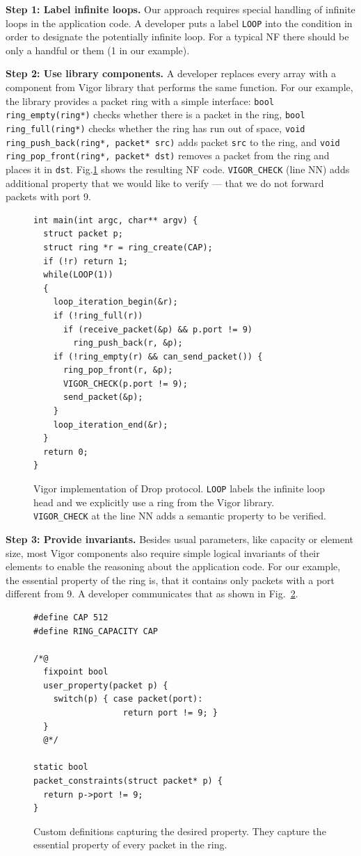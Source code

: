 \documentclass[letterpaper,twocolumn,10pt]{article}
\newcommand{\code}[1]{\lstinline{#1}}
\begin{document}
{\bf Step 1: Label infinite loops.} Our approach requires special handling of
infinite loops in the application code. A developer puts a label \code{LOOP}
into the condition in order to designate the potentially infinite loop. For a
typical NF there should be only a handful or them (1 in our example).

{\bf Step 2: Use library components. } A developer replaces every array with a
component from Vigor library that performs the same function. For our example,
the library provides a packet ring with a simple interface: \code{bool
  ring_empty(ring*)} checks whether there is a packet in the ring, \code{bool
  ring_full(ring*)} checks whether the ring has run out of space, \code{void
  ring_push_back(ring*, packet* src)} adds packet \code{src} to the ring, and
\code{void ring_pop_front(ring*, packet* dst)} removes a packet from the ring
and places it in \code{dst}. Fig.\ref{lst:vigor} shows the resulting NF code.
\code{VIGOR_CHECK} (line NN) adds additional property that we would like to
verify --- that we do not forward packets with port 9.

\begin{figure}[h!]
\begin{lstlisting}
int main(int argc, char** argv) {
  struct packet p;
  struct ring *r = ring_create(CAP);
  if (!r) return 1;
  while(LOOP(1))
  {
    loop_iteration_begin(&r);
    if (!ring_full(r))
      if (receive_packet(&p) && p.port != 9)
        ring_push_back(r, &p);
    if (!ring_empty(r) && can_send_packet()) {
      ring_pop_front(r, &p);
      VIGOR_CHECK(p.port != 9);
      send_packet(&p);
    }
    loop_iteration_end(&r);
  }
  return 0;
}
\end{lstlisting}
  \caption{Vigor implementation of Drop protocol. \code{LOOP} labels the
    infinite loop head and we explicitly use a ring from the Vigor library.
    \code{VIGOR_CHECK} at the line NN adds a semantic property to be verified.}
  \label{lst:vigor}
\end{figure}

{\bf Step 3: Provide invariants.} Besides usual parameters, like capacity or
element size, most Vigor components also require simple logical invariants of
their elements to enable the reasoning about the application code. For our
example, the essential property of the ring is, that it contains only packets
with a port different from 9. A developer communicates that as shown in
Fig.~\ref{lst:customizations}.

\begin{figure}
\begin{lstlisting}
#define CAP 512
#define RING_CAPACITY CAP

/*@
  fixpoint bool
  user_property(packet p) {
    switch(p) { case packet(port):
                  return port != 9; }
  }
  @*/

static bool
packet_constraints(struct packet* p) {
  return p->port != 9;
}
\end{lstlisting}
  \caption{Custom definitions capturing the desired property. They capture the
    essential property of every packet in the ring.}
  \label{lst:customizations}
\end{figure}
\end{document}
